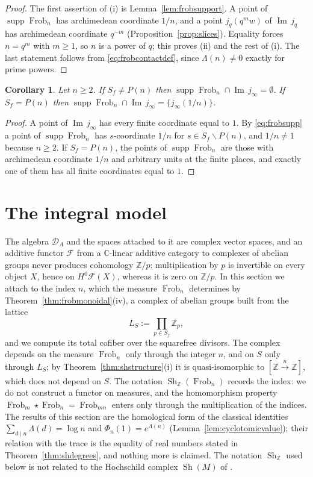 \documentclass[11pt]{amsart}
\newtheorem{corollary}[theorem]{Corollary}
\theoremstyle{definition}
\newcommand{\C}{\mathbb C}
\newcommand{\Z}{\mathbb Z}
\newcommand{\Iml}{\operatorname{Im}}
\newcommand{\Frob}{\operatorname{Frob}}
\newcommand{\Sh}{\operatorname{Sh}}
\newcommand{\supp}{\operatorname{supp}}
\newcommand{\DA}{\mathcal D_A}
\begin{document}
\begin{proof}
The first assertion of (i) is Lemma~\ref{lem:frobsupport}. A point of
$\supp\Frob_n$ has archimedean coordinate $1/n$, and a point $j_q(q^mw)$ of
$\Iml\,j_q$ has archimedean coordinate $q^{-m}$
(Proposition~\ref{prop:slices}). Equality forces $n=q^m$ with $m\ge1$, so $n$
is a power of $q$; this proves (ii) and the rest of (i). The last statement
follows from \eqref{eq:frobcontactdef}, since $\Lambda(n)\ne0$ exactly for
prime powers.
\end{proof}

\begin{corollary}\label{cor:frobnoarch}
Let $n\ge2$. If $S_f\ne P(n)$ then $\supp\Frob_n\cap\Iml\,j_\infty=\emptyset$.
If $S_f=P(n)$ then $\supp\Frob_n\cap\Iml\,j_\infty=\{j_\infty(1/n)\}$.
\end{corollary}

\begin{proof}
A point of $\Iml\,j_\infty$ has every finite coordinate equal to $1$. By
\eqref{eq:frobsupp} a point of $\supp\Frob_n$ has $s$-coordinate $1/n$ for
$s\in S_f\smallsetminus P(n)$, and $1/n\ne1$ because $n\ge2$. If
$S_f=P(n)$, the points of $\supp\Frob_n$ are those with archimedean
coordinate $1/n$ and arbitrary units at the finite places, and exactly one of
them has all finite coordinates equal to $1$.
\end{proof}

\section{The integral model}\label{sec:integral}

The algebra $\DA$ and the spaces attached to it are complex vector spaces,
and an additive functor $\mathcal F$ from a $\C$-linear additive category to complexes of
abelian groups never produces cohomology $\Z/p$: multiplication by $p$ is
invertible on every object $X$, hence on $H^0\mathcal F(X)$, whereas it is
zero on $\Z/p$. In this section we attach to the index $n$, which the
measure $\Frob_n$ determines by Theorem~\ref{thm:frobmonoidal}(iv), a complex
of abelian groups built from the lattice
\[
  L_S:=\prod_{p\in S_f}\Z_p ,
\]
and we compute its total cofiber over the squarefree divisors. The complex
depends on the measure $\Frob_n$ only through the integer $n$, and on $S$
only through $L_S$; by Theorem~\ref{thm:shstructure}(i) it is
quasi-isomorphic to $[\Z\xrightarrow{n}\Z]$, which does not depend on $S$.
The notation $\Sh_\Z(\Frob_n)$ records the index: we do not construct a
functor on measures, and the homomorphism property $\Frob_m\star\Frob_n
=\Frob_{mn}$ enters only through the multiplication of the indices. The
results of this section are the homological form of the classical identities
$\sum_{d\mid n}\Lambda(d)=\log n$ and $\Phi_n(1)=e^{\Lambda(n)}$
(Lemma~\ref{lem:cyclotomicvalue}); their relation with the trace is the
equality of real numbers stated in Theorem~\ref{thm:shdegrees}, and nothing
more is claimed. The notation $\Sh_\Z$ used below is not related to the
Hochschild complex $\Sh(M)$ of \cite[(4)]{Companion}.
\end{document}
